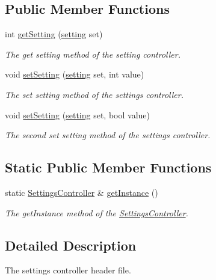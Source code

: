 \subsection*{Public Member Functions}
\begin{DoxyCompactItemize}
\item 
int \hyperlink{class_settings_controller_a5fa15bf7c80e861b82bd82e0a56b6556}{get\+Setting} (\hyperlink{class_settings_controller_a757d865f9b5d8fa3f4d96048d698e03c}{setting} set)
\begin{DoxyCompactList}\small\item\em The get setting method of the setting controller. \end{DoxyCompactList}\item 
void \hyperlink{class_settings_controller_ac02e8998adc861f887dc72c4d682b4ae}{set\+Setting} (\hyperlink{class_settings_controller_a757d865f9b5d8fa3f4d96048d698e03c}{setting} set, int value)
\begin{DoxyCompactList}\small\item\em The set setting method of the settings controller. \end{DoxyCompactList}\item 
void \hyperlink{class_settings_controller_a71259292684df0732543ec3ea23ce61f}{set\+Setting} (\hyperlink{class_settings_controller_a757d865f9b5d8fa3f4d96048d698e03c}{setting} set, bool value)
\begin{DoxyCompactList}\small\item\em The second set setting method of the settings controller. \end{DoxyCompactList}\end{DoxyCompactItemize}
\subsection*{Static Public Member Functions}
\begin{DoxyCompactItemize}
\item 
static \hyperlink{class_settings_controller}{Settings\+Controller} \& \hyperlink{class_settings_controller_a5f01530df4d82ba540c904cae8ed44d5}{get\+Instance} ()
\begin{DoxyCompactList}\small\item\em The get\+Instance method of the \hyperlink{class_settings_controller}{Settings\+Controller}. \end{DoxyCompactList}\end{DoxyCompactItemize}


\subsection{Detailed Description}
The settings controller header file. 

